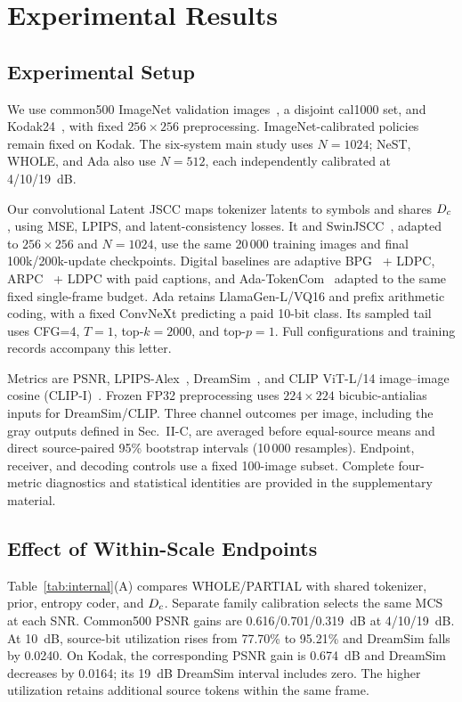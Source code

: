 \section{Experimental Results}
\ifCLASSOPTIONonecolumn\fi
\subsection{Experimental Setup}
We use common500 ImageNet validation images~\cite{imagenet}, a disjoint cal1000 set, and Kodak24~\cite{kodak}, with fixed $256\times256$ preprocessing. ImageNet-calibrated policies remain fixed on Kodak. The six-system main study uses $N=1024$; NeST, WHOLE, and Ada also use $N=512$, each independently calibrated at 4/10/19~dB.

Our convolutional Latent JSCC maps tokenizer latents to symbols and shares $D_c$, using MSE, LPIPS, and latent-consistency losses. It and SwinJSCC~\cite{swinjscc}, adapted to $256\times256$ and $N{=}1024$, use the same 20\,000 training images and final 100k/200k-update checkpoints. Digital baselines are adaptive BPG~\cite{bpg} + LDPC, ARPC~\cite{arpc} + LDPC with paid captions, and Ada-TokenCom~\cite{adatokencom} adapted to the same fixed single-frame budget. Ada retains LlamaGen-L/VQ16 and prefix arithmetic coding, with a fixed ConvNeXt predicting a paid 10-bit class. Its sampled tail uses CFG=4, $T=1$, top-$k=2000$, and top-$p=1$. Full configurations and training records accompany this letter.

Metrics are PSNR, LPIPS-Alex~\cite{lpips}, DreamSim~\cite{dreamsim}, and CLIP ViT-L/14 image--image cosine (CLIP-I)~\cite{clip}. Frozen FP32 preprocessing uses $224\times224$ bicubic-antialias inputs for DreamSim/CLIP. Three channel outcomes per image, including the gray outputs defined in Sec.~II-C, are averaged before equal-source means and direct source-paired 95\% bootstrap intervals (10\,000 resamples). Endpoint, receiver, and decoding controls use a fixed 100-image subset. Complete four-metric diagnostics and statistical identities are provided in the supplementary material.

\ifCLASSOPTIONonecolumn\else\fi
\subsection{Effect of Within-Scale Endpoints}

Table~\ref{tab:internal}(A) compares WHOLE/PARTIAL with shared tokenizer, prior, entropy coder, and $D_c$. Separate family calibration selects the same MCS at each SNR. Common500 PSNR gains are 0.616/0.701/0.319~dB at 4/10/19~dB. At 10~dB, source-bit utilization rises from 77.70\% to 95.21\% and DreamSim falls by 0.0240. On Kodak, the corresponding PSNR gain is 0.674~dB and DreamSim decreases by 0.0164; its 19~dB DreamSim interval includes zero. The higher utilization retains additional source tokens within the same frame.

